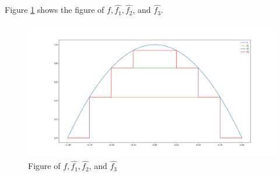 \documentclass{myhw}
\begin{document}
\begin{homeworkProblem}
\begin{homeworkSection}
\begin{gather*}
\begin{aligned}
\end{aligned}
\end{gather*}
Figure \ref{fig:q1.2} shows the figure of $f, \hat{f_1}, \hat{f_2}$, and $\hat{f_3}$.
\begin{figure}[ht]
  \centering
  \includegraphics[width=\textwidth]{a1_2.png} 
  \caption{Figure of $f, \hat{f_1}, \hat{f_2}$, and $\hat{f_3}$}
  \label{fig:q1.2}
\end{figure}
\end{homeworkSection}
\end{homeworkProblem}
\end{document}
